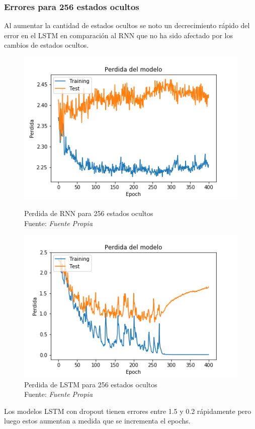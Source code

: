\subsubsection{Errores para 256 estados ocultos}
Al aumentar la cantidad de estados ocultos se noto un decrecimiento rápido del error en el LSTM en comparación al RNN que no ha sido afectado por los cambios de estados ocultos.
\begin{figure}[H]
	\centering
	\includegraphics[width=0.7\linewidth]{Figures/rnn_256_cost}
	\caption{Perdida de RNN para 256 estados ocultos\\ Fuente: {\textit{Fuente Propia}}}
	\label{fig:rnn256cost}
	
	\centering
	\includegraphics[width=0.7\linewidth]{Figures/lstm_256_cost13}
	\caption{Perdida de LSTM para 256 estados ocultos\\ Fuente: {\textit{Fuente Propia}}}
	\label{fig:lstm256cost13}
\end{figure}
\newpage
Los modelos LSTM con dropout tienen errores entre 1.5 y 0.2 rápidamente pero luego estos aumentan a medida que se incrementa el epochs.
